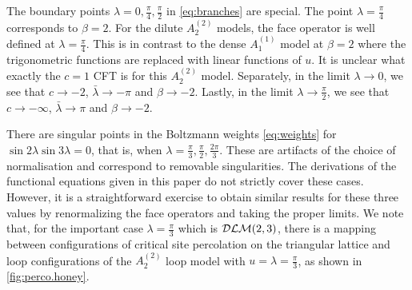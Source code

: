 \documentclass[11pt]{article}
\numberwithin{equation}{section}
\theoremstyle{plain}
\numberwithin{equation}{section}
\begin{document}
The boundary points $\lambda=0, \frac \pi 4, \frac \pi 2$ in \eqref{eq:branches} are special.
The point $\lambda=\frac{\pi}{4}$ corresponds to $\beta = 2$. For the dilute $A_2^{(2)}$ models, the face operator is well defined at $\lambda = \frac{\pi}{4}$. This is in contrast to the dense  $A_1^{(1)}$ model at $\beta=2$ where the trigonometric functions are replaced with linear functions of $u$. It is unclear what exactly the $c=1$ CFT  is for this $A_2^{(2)}$ model. Separately, in the limit $\lambda\to 0$, we see that $c\to -2$, $\bar\lambda\to -\pi$ and $\beta\to -2$. Lastly, in the limit $\lambda\to\frac{\pi}{2}$, we see that $c\to-\infty$, $\bar\lambda\to \pi$ and $\beta\to -2$. 

There are singular points in the Boltzmann weights \eqref{eq:weights} for $\sin 2 \lambda \sin 3 \lambda = 0$, that is, when $\lambda = \frac \pi 3, \frac \pi 2, \frac{2\pi}3$. These are artifacts of the choice of normalisation and correspond to removable singularities. The derivations of the functional equations given in this paper do not strictly cover these cases. However, it is a straightforward exercise to obtain similar results for these three values by renormalizing the face operators and taking the proper limits. We note that, for the important case $\lambda=\frac{\pi}{3}$ which is ${\cal DLM}(2,3)$, there is a mapping~\cite{FeherNien2015} between configurations of critical site percolation on the triangular lattice and loop configurations of the $A_2^{(2)}$ loop model with $u = \lambda = \frac \pi 3$, as shown in \cref{fig:perco.honey}.
\end{document}

